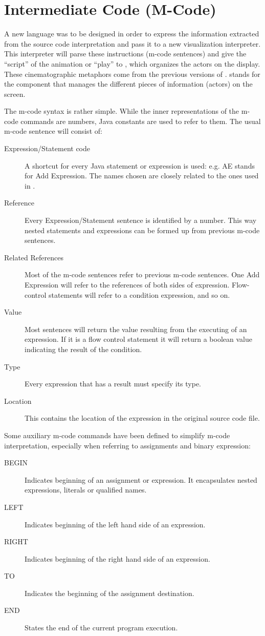 \section{Intermediate Code (M-Code)}
\label{sec:Intermediate_Code}

A new language was to be designed in order to express the
information extracted from the source code interpretation and pass
it to a new visualization interpreter. This interpreter will parse
these instructions (m-code sentences) and give the ``script'' of
the animation or ``play'' to , which organizes the
actors on the display. These cinematographic metaphors come from
the previous versions of \jel{}.  stands for the
component that manages the different pieces of information
(actors) on the screen.

The m-code syntax is rather simple. While the inner representations
of the m-code commands are numbers, Java constants are used to
refer to them. The usual m-code sentence will consist of:

\begin{description}
\item[Expression/Statement code] A shortcut for every Java
statement or expression is used: e.g. AE stands for Add
Expression. The names chosen are closely related to the ones used
in \djava{}. \item[Reference] Every Expression/Statement sentence
is identified by a number. This way nested statements and
expressions can be formed up from previous {m-code} sentences.
\item[Related References] Most of the {m-code} sentences refer to
previous m-code sentences. One Add Expression will refer to the
references of both sides of expression. Flow-control statements
will refer to a condition expression, and so on. \item[Value] Most
sentences will return the value resulting from the executing of an
expression. If it is a flow control statement it will return a
boolean value indicating the result of the condition. \item[Type]
Every expression that has a result must specify its type.
\item[Location] This contains the location of the expression in
the original source code file.
\end{description}

Some auxiliary {m-code} commands have been defined to simplify m-code
interpretation, especially when referring to assignments and binary expression:
\begin{description}
\item[BEGIN] Indicates beginning of an assignment or expression.
It encapsulates nested expressions, literals or qualified names.
\item[LEFT] Indicates beginning of the left hand side of an expression.
\item[RIGHT] Indicates beginning of the right hand side of an expression.
\item[TO] Indicates the beginning of the assignment destination.
\item[END]  States the end of the current program execution.
\end{description}

